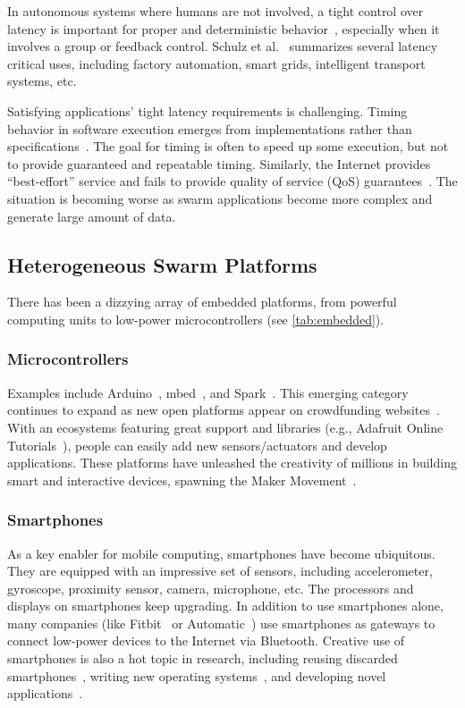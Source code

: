 In autonomous systems where humans are not involved, a tight control over
latency is important for proper and deterministic
behavior~\cite{eidson2012distributed}, especially when it involves a group or
feedback control. Schulz et al.~\cite{schulz2017latency} summarizes several
latency critical uses, including factory automation, smart grids, intelligent
transport systems, etc.

Satisfying applications' tight latency requirements is challenging. Timing
behavior in software execution emerges from implementations rather than
specifications~\cite{lee2018real}. The goal for timing is often to speed up some
execution, but not to provide guaranteed and repeatable timing. Similarly, the
Internet provides ``best-effort'' service and fails to provide quality of
service (QoS) guarantees~\cite{shenker1995fundamental}. The situation is
becoming worse as swarm applications become more complex and generate large
amount of data.

\subsection{Heterogeneous Swarm Platforms}
\label{sec:swarm-platforms}

There has been a dizzying array of embedded platforms, from powerful computing
units to low-power microcontrollers (see \autoref{tab:embedded}).

\subsubsection{Microcontrollers}

Examples include Arduino~\cite{arduino}, mbed~\cite{mbed}, and
Spark~\cite{spark}. This emerging category continues to expand as new open
platforms appear on crowdfunding websites~\cite{kickstarter}.  With an
ecosystems featuring great support and libraries (e.g., Adafruit Online
Tutorials~\cite{adafruit}), people can easily add new sensors/actuators and
develop applications. These platforms have unleashed the creativity of millions
in building smart and interactive devices, spawning the Maker
Movement~\cite{dougherty2012maker}.

\subsubsection{Smartphones}

As a key enabler for mobile computing, smartphones have become ubiquitous. They
are equipped with an impressive set of sensors, including accelerometer,
gyroscope, proximity sensor, camera, microphone, etc. The processors and
displays on smartphones keep upgrading. In addition to use smartphones alone,
many companies (like Fitbit~\cite{fitbit} or Automatic~\cite{automatic}) use
smartphones as gateways to connect low-power devices to the Internet via
Bluetooth. Creative use of smartphones is also a hot topic in research,
including reusing discarded smartphones~\cite{challen2014mote}, writing new
operating systems~\cite{janos}, and developing novel
applications~\cite{hong2014smartphone}.

